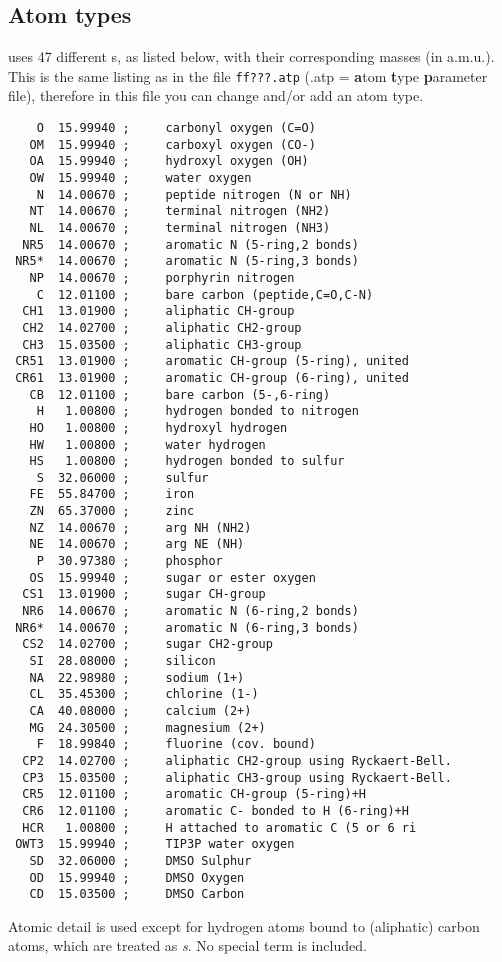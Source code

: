 \subsection{Atom types}
\label{subsec:atomtype}
{\gromacs} uses 47 different s, 
as listed below, with their
corresponding masses (in a.m.u.). This is the same listing as in the
file {\tt ff???.atp} (.atp = {\bf a}tom {\bf t}ype {\bf p}arameter
file), therefore in this file you can change and/or add an atom type.
{\small\begin{verbatim}
    O  15.99940 ;     carbonyl oxygen (C=O)
   OM  15.99940 ;     carboxyl oxygen (CO-)
   OA  15.99940 ;     hydroxyl oxygen (OH)
   OW  15.99940 ;     water oxygen
    N  14.00670 ;     peptide nitrogen (N or NH)
   NT  14.00670 ;     terminal nitrogen (NH2)
   NL  14.00670 ;     terminal nitrogen (NH3)
  NR5  14.00670 ;     aromatic N (5-ring,2 bonds)
 NR5*  14.00670 ;     aromatic N (5-ring,3 bonds)
   NP  14.00670 ;     porphyrin nitrogen
    C  12.01100 ;     bare carbon (peptide,C=O,C-N)
  CH1  13.01900 ;     aliphatic CH-group
  CH2  14.02700 ;     aliphatic CH2-group
  CH3  15.03500 ;     aliphatic CH3-group
 CR51  13.01900 ;     aromatic CH-group (5-ring), united
 CR61  13.01900 ;     aromatic CH-group (6-ring), united
   CB  12.01100 ;     bare carbon (5-,6-ring)
    H   1.00800 ;     hydrogen bonded to nitrogen
   HO   1.00800 ;     hydroxyl hydrogen
   HW   1.00800 ;     water hydrogen
   HS   1.00800 ;     hydrogen bonded to sulfur
    S  32.06000 ;     sulfur
   FE  55.84700 ;     iron
   ZN  65.37000 ;     zinc
   NZ  14.00670 ;     arg NH (NH2)
   NE  14.00670 ;     arg NE (NH)
    P  30.97380 ;     phosphor
   OS  15.99940 ;     sugar or ester oxygen
  CS1  13.01900 ;     sugar CH-group
  NR6  14.00670 ;     aromatic N (6-ring,2 bonds)
 NR6*  14.00670 ;     aromatic N (6-ring,3 bonds)
  CS2  14.02700 ;     sugar CH2-group
   SI  28.08000 ;     silicon
   NA  22.98980 ;     sodium (1+)
   CL  35.45300 ;     chlorine (1-)
   CA  40.08000 ;     calcium (2+)
   MG  24.30500 ;     magnesium (2+)
    F  18.99840 ;     fluorine (cov. bound)
  CP2  14.02700 ;     aliphatic CH2-group using Ryckaert-Bell.
  CP3  15.03500 ;     aliphatic CH3-group using Ryckaert-Bell.
  CR5  12.01100 ;     aromatic CH-group (5-ring)+H
  CR6  12.01100 ;     aromatic C- bonded to H (6-ring)+H
  HCR   1.00800 ;     H attached to aromatic C (5 or 6 ri
 OWT3  15.99940 ;     TIP3P water oxygen
   SD  32.06000 ;     DMSO Sulphur
   OD  15.99940 ;     DMSO Oxygen
   CD  15.03500 ;     DMSO Carbon
\end{verbatim}}
Atomic detail is used except for hydrogen atoms bound to (aliphatic)
carbon atoms, which are treated as {\em {}s}. No
special  term is included.

